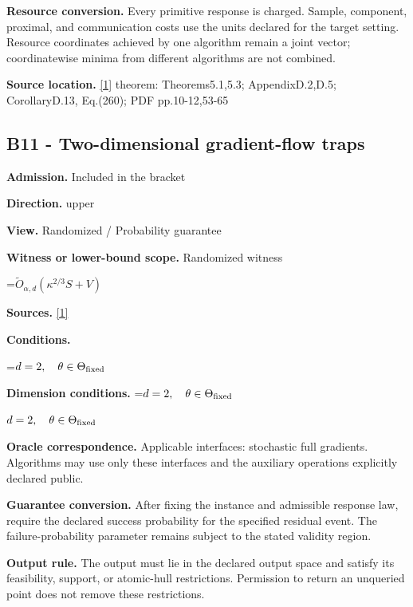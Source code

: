 \documentclass[10pt,a4paper]{article}
\newcommand{\AtlasMath}[1]{\par\begingroup\centering\setbox0=\hbox{$\displaystyle #1$}\ifdim\wd0>1.4\linewidth\typeout{ATLAS WIDE FORMULA: \the\wd0}\fi\ifdim\wd0>\linewidth\resizebox{\linewidth}{!}{\box0}\else\box0\fi\par\endgroup}
\newcommand{\AtlasInlineMath}[1]{\begingroup\setbox0=\hbox{$#1$}\ifdim\wd0>.4\linewidth\endgroup\AtlasMath{#1}\else\endgroup$#1$\fi}
\begin{document}
\textbf{Resource conversion.} Every primitive response is charged. Sample, component, proximal, and communication costs use the units declared for the target setting. Resource coordinates achieved by one algorithm remain a joint vector; coordinatewise minima from different algorithms are not combined.



\textbf{Source location.} \href{https://arxiv.org/pdf/2609.03990}{[1]} theorem: Theorems5.1,5.3; AppendixD.2,D.5; CorollaryD.13, Eq.(260); PDF pp.10-12,53-65



\subsection{B11 - Two-dimensional gradient-flow traps}


\textbf{Admission.} Included in the bracket



\textbf{Direction.} upper



\textbf{View.} Randomized / Probability guarantee



\textbf{Witness or lower-bound scope.} Randomized witness



\AtlasMath{\widetilde{O}_{\alpha,d}(\kappa^{2/3}S+V)}


\textbf{Sources.} \href{https://arxiv.org/pdf/2609.03990}{[1]}



\textbf{Conditions.}
\AtlasMath{d=2,\quad\theta\in\Theta_{\rm fixed}}




\textbf{Dimension conditions.} \AtlasInlineMath{d=2,\quad\theta\in\Theta_{\rm fixed}}



\textbf{Oracle correspondence.} Applicable interfaces: stochastic full gradients. Algorithms may use only these interfaces and the auxiliary operations explicitly declared public.



\textbf{Guarantee conversion.} After fixing the instance and admissible response law, require the declared success probability for the specified residual event. The failure-probability parameter remains subject to the stated validity region.



\textbf{Output rule.} The output must lie in the declared output space and satisfy its feasibility, support, or atomic-hull restrictions. Permission to return an unqueried point does not remove these restrictions.
\end{document}

